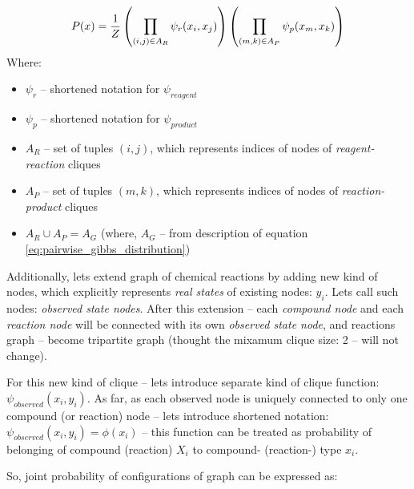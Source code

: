 \documentclass[10pt]{article}
\begin{document}
\begin{equation}
P(x) = {1 \over Z} \left( \prod_{(i,j) \in A_R} \psi_{r}(x_i, x_j) \right) \left( \prod_{(m,k) \in A_P} \psi_{p}(x_m, x_k) \right)
\end{equation}
Where:
\begin{itemize}
    \setlength \itemsep{0em}
    \item $\psi_{r}$ -- shortened notation for $\psi_{reagent}$
    \item $\psi_{p}$ -- shortened notation for $\psi_{product}$
    \item $A_R$ -- set of tuples $(i,j)$, which represents indices of nodes of \emph{reagent-reaction} cliques
    \item $A_P$ -- set of tuples $(m,k)$, which represents indices of nodes of \emph{reaction-product} cliques
    \item $A_R \cup A_P = A_G$ (where, $A_G$ -- from description of equation \eqref{eq:pairwise_gibbs_distribution})
\end{itemize}

Additionally, lets extend graph of chemical reactions by adding new kind of nodes, which explicitly represents \emph{real states} of existing nodes: $y_i$. Lets call such nodes: \emph{observed state nodes}. After this extension -- each \emph{compound node} and each \emph{reaction node} will be connected with its own \emph{observed state node}, and reactions graph -- become tripartite graph (thought the mixamum clique size: 2 -- will not change).

For this new kind of clique -- lets introduce separate kind of clique function: $\psi_{observed}(x_i, y_i)$. As far, as each observed node is uniquely connected to only one compound (or reaction) node -- lets introduce shortened notation: $\psi_{observed}(x_i, y_i) = \phi(x_i)$ -- this function can be treated as probability of belonging of compound (reaction) $X_i$ to compound- (reaction-) type $x_i$.

So, joint probability of configurations of graph can be expressed as:
\end{document}
